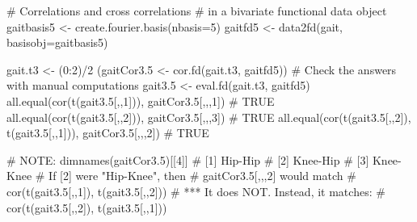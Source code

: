 \documentclass{article}
\begin{document}
\begin{Examples}
\begin{ExampleCode}
# Correlations and cross correlations
# in a bivariate functional data object
gaitbasis5 <- create.fourier.basis(nbasis=5)
gaitfd5 <- data2fd(gait, basisobj=gaitbasis5)

gait.t3 <- (0:2)/2
(gaitCor3.5 <- cor.fd(gait.t3, gaitfd5))
# Check the answers with manual computations
gait3.5 <- eval.fd(gait.t3, gaitfd5)
all.equal(cor(t(gait3.5[,,1])), gaitCor3.5[,,,1])
# TRUE
all.equal(cor(t(gait3.5[,,2])), gaitCor3.5[,,,3])
# TRUE
all.equal(cor(t(gait3.5[,,2]), t(gait3.5[,,1])),
               gaitCor3.5[,,,2])
# TRUE

# NOTE:
dimnames(gaitCor3.5)[[4]]
# [1] Hip-Hip
# [2] Knee-Hip 
# [3] Knee-Knee
# If [2] were "Hip-Knee", then
# gaitCor3.5[,,,2] would match 
# cor(t(gait3.5[,,1]), t(gait3.5[,,2]))
# *** It does NOT.  Instead, it matches:  
# cor(t(gait3.5[,,2]), t(gait3.5[,,1]))

\end{ExampleCode}
\end{Examples}
\end{document}
